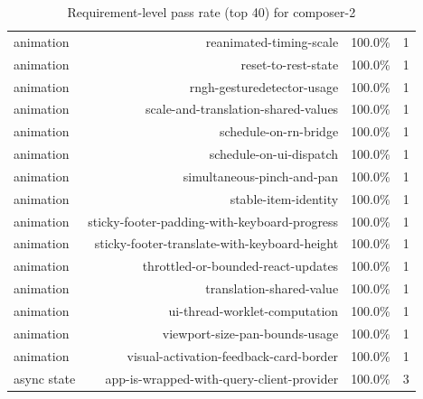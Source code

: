 \begin{table}[htbp]
\begin{tabular}{lrrr}
animation & reanimated-timing-scale & 100.0\% & 1 \\
animation & reset-to-rest-state & 100.0\% & 1 \\
animation & rngh-gesturedetector-usage & 100.0\% & 1 \\
animation & scale-and-translation-shared-values & 100.0\% & 1 \\
animation & schedule-on-rn-bridge & 100.0\% & 1 \\
animation & schedule-on-ui-dispatch & 100.0\% & 1 \\
animation & simultaneous-pinch-and-pan & 100.0\% & 1 \\
animation & stable-item-identity & 100.0\% & 1 \\
animation & sticky-footer-padding-with-keyboard-progress & 100.0\% & 1 \\
animation & sticky-footer-translate-with-keyboard-height & 100.0\% & 1 \\
animation & throttled-or-bounded-react-updates & 100.0\% & 1 \\
animation & translation-shared-value & 100.0\% & 1 \\
animation & ui-thread-worklet-computation & 100.0\% & 1 \\
animation & viewport-size-pan-bounds-usage & 100.0\% & 1 \\
animation & visual-activation-feedback-card-border & 100.0\% & 1 \\
async state & app-is-wrapped-with-query-client-provider & 100.0\% & 3 \\
\bottomrule
\end{tabular}
\caption{Requirement-level pass rate (top 40) for composer-2}
\end{table}
